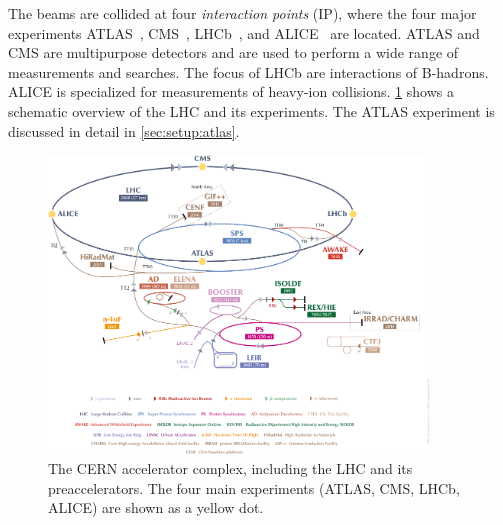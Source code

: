 The beams are collided at four \emph{interaction points} (IP), where the four major experiments
ATLAS~\cite{ATLAS}, CMS~\cite{CMS}, LHCb~\cite{LHCb}, and ALICE~\cite{ALICE} are located.
ATLAS and CMS are multipurpose detectors and are used to perform a wide range of measurements and searches.
The focus of LHCb are interactions of B-hadrons.
ALICE is specialized for measurements of heavy-ion collisions.
\cref{fig:setup:accelerators} shows a schematic overview of the LHC and its experiments.
The ATLAS experiment is discussed in detail in \cref{sec:setup:atlas}.
\begin{figure}[htb]
    \centering
    \includegraphics[width=0.9\textwidth]{./figures/setup/accelerators.png}
    \caption{The CERN accelerator complex, including the LHC and its preaccelerators.
             The four main experiments (ATLAS, CMS, LHCb, ALICE) are shown as a yellow dot.~\cite{ImageLHC}}\label{fig:setup:accelerators}
\end{figure}

